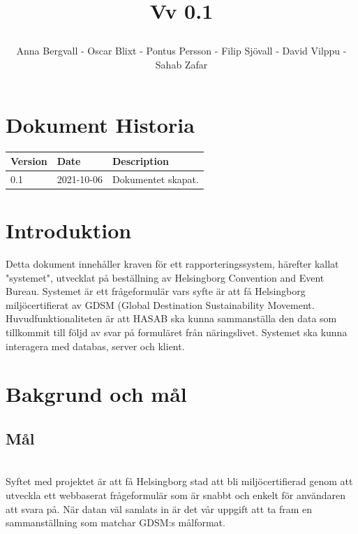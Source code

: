 \documentclass{article}
\date {#1}
\title {
    \documentNumber {01}    

    \documentTitle {Helsingborg Event and Convention Bureau}
    
    \documentDate {2021-08-20}
    \documentVersion Vv 0.1
    
    \author{Anna Bergvall - Oscar Blixt - Pontus Persson - Filip Sjövall - David Vilppu - Sahab Zafar}
}
\begin{document}
\maketitle

\thispagestyle{empty}



\newpage

\tableofcontents


\newpage

\section{Dokument Historia}
\begin{tabular}{ l | l | l }
    Version & Date & Description \\
    \hline
    0.1 & 2021-10-06 & Dokumentet skapat. \\
    
\end{tabular}

\section{Introduktion}
    Detta dokument innehåller kraven för ett rapporteringssystem, härefter kallat "systemet", utvecklat på beställning av Helsingborg Convention and Event Bureau. Systemet är ett frågeformulär vars syfte är att få Helsingborg miljöcertifierat av GDSM (Global Destination Sustainability Movement. Huvudfunktionaliteten är att HASAB ska kunna sammanställa den data som tillkommit till följd av svar på formuläret från näringslivet. Systemet ska kunna interagera med databas, server och klient.
    

\section{Bakgrund och mål}

    \subsection{Mål}\\

       Syftet med projektet är att få Helsingborg stad att bli miljöcertifierad genom att utveckla ett webbaserat frågeformulär som är snabbt och enkelt för användaren att svara på. När datan väl samlats in är det vår uppgift att ta fram en sammanställning som matchar GDSM:s målformat.
        
\end{document}

